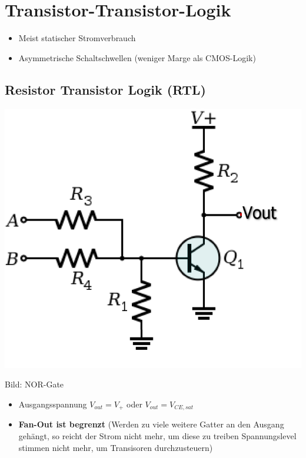\section{Transistor-Transistor-Logik}

\begin{itemize}
    \item Meist statischer Stromverbrauch
    \item Asymmetrische Schaltschwellen (weniger Marge als CMOS-Logik)
\end{itemize}


\subsection{Resistor Transistor Logik (RTL)}

\begin{minipage}[c]{0.27\columnwidth}
    \includegraphics[width=\columnwidth]{images/rtl_nor.png}
\end{minipage}
\hfill
\begin{minipage}[c]{0.68\columnwidth}
    Bild: NOR-Gate

    \begin{itemize}
        \item Ausgangsspannung $V_{out} = V_+$ oder $V_{out} = V_{CE,sat}$
        \item \textbf{Fan-Out ist begrenzt} (Werden zu viele weitere Gatter an den Ausgang gehängt, so reicht der Strom nicht mehr,
             um diese zu treiben \textrightarrow Spannungslevel stimmen nicht mehr, um Transisoren durchzusteuern)
    \end{itemize}
\end{minipage}


